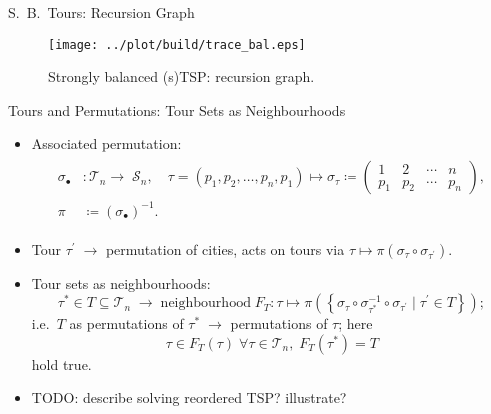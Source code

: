 \documentclass[
  size=8pt,
  style=klope,
  paper=screen,
  pauseslide,
  nopagebreaks,
  hlsections,
  fleqn
]{powerdot}
\def\todo{\color{red}}
\def\eqitspace{\vspace{-5mm}}
\begin{document}
\begin{slide}[toc=]{S.\ B.\ Tours: Recursion Graph}
  \begin{figure}[H]
    \centering
    \texttt{[image: ../plot/build/trace\_bal.eps]}
    \caption{Strongly balanced (s)TSP: recursion graph.}
  \end{figure}
\end{slide}

\begin{slide}{Tours and Permutations: Tour Sets as Neighbourhoods}
  \begin{itemize}
  \item
  Associated permutation:
  \begin{align}
  \begin{split}
    \sigma_\bullet & :
    \mathcal{T}_n \to \; \mathcal{S}_n, \quad
    \tau = \left(p_1, p_2, \ldots, p_n, p_1 \right)
    \mapsto
  \sigma_\tau \coloneqq
  \begin{pmatrix}
    1 & 2 & \cdots & n \\
    p_1 & p_2 & \cdots &  p_n
  \end{pmatrix},
  \\
  \pi & \coloneqq \left(\sigma_{\bullet}\right)^{-1}.
  \end{split}
  \end{align}
  \eqitspace%
  \item
  Tour $\tau^\prime \; \rightarrow$ permutation of cities, acts on tours via $\tau \mapsto \pi\left(\sigma_\tau \circ \sigma_{\tau^\prime}\right)$.
  \item
    Tour sets as neighbourhoods:
    \begin{equation}
      \tau^\ast \in T \subseteq \mathcal{T}_n
      \; \rightarrow \;
      \text{neighbourhood} \;
      F_T : \tau \mapsto
      \pi \left(
        \left\{ \sigma_{\tau} \circ \sigma_{\tau^\ast}^{-1} \circ \sigma_{\tau^\prime} \mid \tau^{\prime} \in T\right\}
      \right);
    \end{equation}
    i.e.\ $T$ as permutations of $\tau^\ast \; \rightarrow $ permutations of $\tau$;
    here
    \begin{equation*}
      \tau \in F_T\left(\tau\right) \; \forall \tau \in \mathcal{T}_n, \; F_T\left(\tau^\ast\right) = T
    \end{equation*} hold true.
  \item
  {\todo TODO:} describe solving reordered TSP?  illustrate?
  \end{itemize}
\end{slide}
\end{document}
